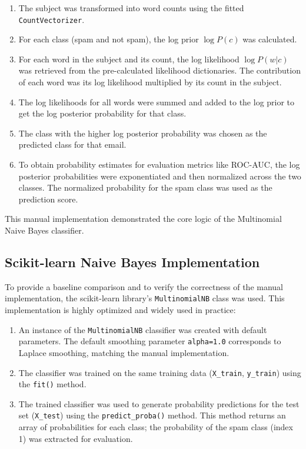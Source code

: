 \documentclass[12pt,letterpaper]{article}
\begin{document}
\begin{enumerate}
    \item The subject was transformed into word counts using the fitted \texttt{CountVectorizer}.
    
    \item For each class (spam and not spam), the log prior $\log P(c)$ was calculated.
    
    \item For each word in the subject and its count, the log likelihood $\log P(w | c)$ was retrieved from the pre-calculated likelihood dictionaries. The contribution of each word was its log likelihood multiplied by its count in the subject.
    
    \item The log likelihoods for all words were summed and added to the log prior to get the log posterior probability for that class.
    
    \item The class with the higher log posterior probability was chosen as the predicted class for that email.
    
    \item To obtain probability estimates for evaluation metrics like ROC-AUC, the log posterior probabilities were exponentiated and then normalized across the two classes. The normalized probability for the spam class was used as the prediction score.
\end{enumerate}

This manual implementation demonstrated the core logic of the Multinomial Naive Bayes classifier.

\subsection{Scikit-learn Naive Bayes Implementation}

To provide a baseline comparison and to verify the correctness of the manual implementation, the scikit-learn library's \texttt{MultinomialNB} class was used. This implementation is highly optimized and widely used in practice:

\begin{enumerate}
    \item An instance of the \texttt{MultinomialNB} classifier was created with default parameters. The default smoothing parameter \texttt{alpha=1.0} corresponds to Laplace smoothing, matching the manual implementation.
    
    \item The classifier was trained on the same training data (\texttt{X\_train}, \texttt{y\_train}) using the \texttt{fit()} method.
    
    \item The trained classifier was used to generate probability predictions for the test set (\texttt{X\_test}) using the \texttt{predict\_proba()} method. This method returns an array of probabilities for each class; the probability of the spam class (index 1) was extracted for evaluation.
\end{enumerate}
\end{document}
